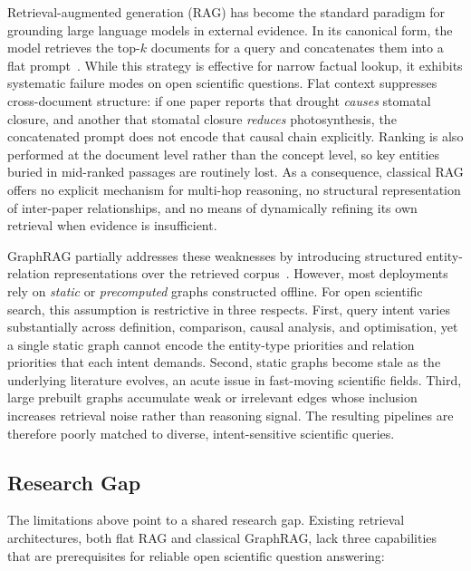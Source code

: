 \documentclass[11pt,a4paper]{article}
\begin{document}
Retrieval-augmented generation (RAG) has become the standard paradigm for
grounding large language models in external evidence. In its canonical form,
the model retrieves the top-$k$ documents for a query and concatenates them
into a flat prompt~\cite{lewis2020rag}. While this strategy is effective for
narrow factual lookup, it exhibits systematic failure modes on open scientific
questions. Flat context suppresses cross-document structure: if one paper
reports that drought \emph{causes} stomatal closure, and another that stomatal
closure \emph{reduces} photosynthesis, the concatenated prompt does not encode
that causal chain explicitly. Ranking is also performed at the document level
rather than the concept level, so key entities buried in mid-ranked passages
are routinely lost. As a consequence, classical RAG offers no explicit
mechanism for multi-hop reasoning, no structural representation of inter-paper
relationships, and no means of dynamically refining its own retrieval when
evidence is insufficient.

GraphRAG partially addresses these weaknesses by introducing structured
entity-relation representations over the retrieved corpus~\cite{edge2024graphrag}.
However, most deployments rely on \emph{static} or \emph{precomputed} graphs
constructed offline. For open scientific search, this assumption is
restrictive in three respects. First, query intent varies substantially across
definition, comparison, causal analysis, and optimisation, yet a single static
graph cannot encode the entity-type priorities and relation priorities that
each intent demands. Second, static graphs become stale as the underlying
literature evolves, an acute issue in fast-moving scientific fields. Third,
large prebuilt graphs accumulate weak or irrelevant edges whose inclusion
increases retrieval noise rather than reasoning signal. The resulting
pipelines are therefore poorly matched to diverse, intent-sensitive scientific
queries.

\subsection{Research Gap}

The limitations above point to a shared research gap. Existing retrieval
architectures, both flat RAG and classical GraphRAG, lack three capabilities
that are prerequisites for reliable open scientific question answering:
\end{document}
